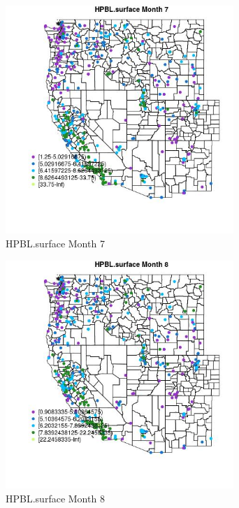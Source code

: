 \begin{figure} 
\centering  
\includegraphics[width=0.77\textwidth]{Code_Outputs/ML_input_report_ML_input_PM25_Step5_part_d_de_duplicated_aves_ML_input_MapObsMo7HPBLsurface.jpg} 
\caption{\label{fig:ML_input_report_ML_input_PM25_Step5_part_d_de_duplicated_aves_ML_inputMapObsMo7HPBLsurface}HPBL.surface Month 7} 
\end{figure} 
 

\begin{figure} 
\centering  
\includegraphics[width=0.77\textwidth]{Code_Outputs/ML_input_report_ML_input_PM25_Step5_part_d_de_duplicated_aves_ML_input_MapObsMo8HPBLsurface.jpg} 
\caption{\label{fig:ML_input_report_ML_input_PM25_Step5_part_d_de_duplicated_aves_ML_inputMapObsMo8HPBLsurface}HPBL.surface Month 8} 
\end{figure} 
 

